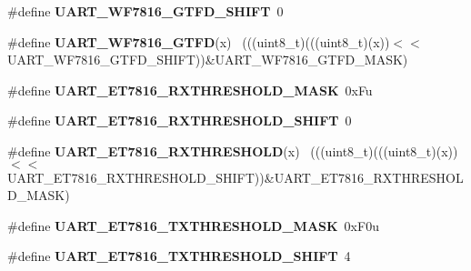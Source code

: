 \begin{DoxyCompactItemize}
\item 
\hypertarget{group___u_a_r_t___register___masks_ga721ba0567ed0305bffa0ee30353aa2c8}{}\#define {\bfseries U\+A\+R\+T\+\_\+\+W\+F7816\+\_\+\+G\+T\+F\+D\+\_\+\+S\+H\+I\+F\+T}~0\label{group___u_a_r_t___register___masks_ga721ba0567ed0305bffa0ee30353aa2c8}

\item 
\hypertarget{group___u_a_r_t___register___masks_ga218200aa93c98c371375369a8b2858d9}{}\#define {\bfseries U\+A\+R\+T\+\_\+\+W\+F7816\+\_\+\+G\+T\+F\+D}(x)                                        ~(((uint8\+\_\+t)(((uint8\+\_\+t)(x))$<$$<$U\+A\+R\+T\+\_\+\+W\+F7816\+\_\+\+G\+T\+F\+D\+\_\+\+S\+H\+I\+F\+T))\&U\+A\+R\+T\+\_\+\+W\+F7816\+\_\+\+G\+T\+F\+D\+\_\+\+M\+A\+S\+K)\label{group___u_a_r_t___register___masks_ga218200aa93c98c371375369a8b2858d9}

\item 
\hypertarget{group___u_a_r_t___register___masks_ga9ef739359fd7d60427900938502e5100}{}\#define {\bfseries U\+A\+R\+T\+\_\+\+E\+T7816\+\_\+\+R\+X\+T\+H\+R\+E\+S\+H\+O\+L\+D\+\_\+\+M\+A\+S\+K}~0x\+Fu\label{group___u_a_r_t___register___masks_ga9ef739359fd7d60427900938502e5100}

\item 
\hypertarget{group___u_a_r_t___register___masks_gacd8498adcff369769fb56dde33ce7465}{}\#define {\bfseries U\+A\+R\+T\+\_\+\+E\+T7816\+\_\+\+R\+X\+T\+H\+R\+E\+S\+H\+O\+L\+D\+\_\+\+S\+H\+I\+F\+T}~0\label{group___u_a_r_t___register___masks_gacd8498adcff369769fb56dde33ce7465}

\item 
\hypertarget{group___u_a_r_t___register___masks_ga2529b3862c9ed6695e520dbce4a631cf}{}\#define {\bfseries U\+A\+R\+T\+\_\+\+E\+T7816\+\_\+\+R\+X\+T\+H\+R\+E\+S\+H\+O\+L\+D}(x)                          ~(((uint8\+\_\+t)(((uint8\+\_\+t)(x))$<$$<$U\+A\+R\+T\+\_\+\+E\+T7816\+\_\+\+R\+X\+T\+H\+R\+E\+S\+H\+O\+L\+D\+\_\+\+S\+H\+I\+F\+T))\&U\+A\+R\+T\+\_\+\+E\+T7816\+\_\+\+R\+X\+T\+H\+R\+E\+S\+H\+O\+L\+D\+\_\+\+M\+A\+S\+K)\label{group___u_a_r_t___register___masks_ga2529b3862c9ed6695e520dbce4a631cf}

\item 
\hypertarget{group___u_a_r_t___register___masks_ga6c3c5365dc3ba6ac54a4bd4330ff60cf}{}\#define {\bfseries U\+A\+R\+T\+\_\+\+E\+T7816\+\_\+\+T\+X\+T\+H\+R\+E\+S\+H\+O\+L\+D\+\_\+\+M\+A\+S\+K}~0x\+F0u\label{group___u_a_r_t___register___masks_ga6c3c5365dc3ba6ac54a4bd4330ff60cf}

\item 
\hypertarget{group___u_a_r_t___register___masks_ga427963f9e067b0856aa8830cae622291}{}\#define {\bfseries U\+A\+R\+T\+\_\+\+E\+T7816\+\_\+\+T\+X\+T\+H\+R\+E\+S\+H\+O\+L\+D\+\_\+\+S\+H\+I\+F\+T}~4\label{group___u_a_r_t___register___masks_ga427963f9e067b0856aa8830cae622291}


\end{DoxyCompactItemize}
